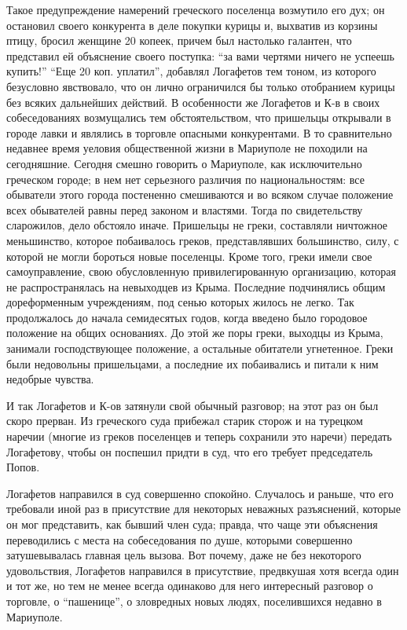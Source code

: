 Такое предупреждение намерений греческого поселенца возмутило его дух; он остановил своего конкурента в деле покупки курицы
и, выхватив из корзины птицу, бросил женщине 20 копеек, причем был настолько галантен, что представил ей объяснение своего поступка:
``за вами чертями ничего не успеешь купить!''
``Еще 20 коп. уплатил'', добавлял Логафетов тем тоном, из которого 
безусловно явствовало, что он лично ограничился бы только отобранием
курицы без всяких дальнейших действий. В особенности
же Логафетов и К-в в своих собеседованиях возмущались тем обстоятельством, 
что пришельцы открывали в
городе лавки и являлись в торговле опасными конкурентами. В то сравнительно
недавнее время уеловия общественной жизни в Мариуполе не походили на сегодняшние.
Сегодня смешно говорить о Мариуполе, как исключительно греческом городе; в нем
нет серьезного различия по национальностям: все обыватели этого города
постененно смешиваются и во всяком случае положение всех обывателей равны перед
законом и властями. Тогда по свидетельству сларожилов, дело обстояло иначе.
Пришельцы не греки, составляли ничтожное меньшинство, которое побаивалось
греков, представлявших большинство, силу, с которой не могли бороться новые
поселенцы. Кроме того, греки имели свое самоуправление, свою обусловленную
привилегированную организацию, которая не распространялась на невыходцев из
Крыма. Последние подчинялись общим дореформенным учреждениям, под сенью которых
жилось не легко. Так продолжалось до начала семидесятых годов, когда введено
было городовое положение на общих основаниях. До этой же поры греки, выходцы из
Крыма, занимали господствующее положение, а остальные обитатели угнетенное.
Греки были недовольны пришельцами, а последние их побаивались и питали к ним
недобрые чувства.

И так Логафетов и К-ов затянули свой обычный разговор; на этот раз он был скоро
прерван. Из греческого суда прибежал старик сторож и на турецком наречии
(многие из греков поселенцев и теперь сохранили это наречи) передать
Логафетову, чтобы он поспешил придти в суд, что его требует председатель Попов.

Логафетов направился в суд совершенно спокойно.
Случалось и раньше, что его требовали иной раз в присутствие
для некоторых неважных разъяснений, которые он мог представить, как бывший член суда;
правда, что чаще эти объяснения переводились с места на собеседования по душе, которыми совершенно
затушевывалась главная цель вызова. Вот почему, даже не без некоторого удовольствия, Логафетов направился 
в присутствие, предвкушая хотя всегда один и тот же, но тем не менее всегда
одинаково для него интересный разговор о торговле, о ``пашенице'', о зловредных
новых людях, поселившихся недавно в Мариуполе.

